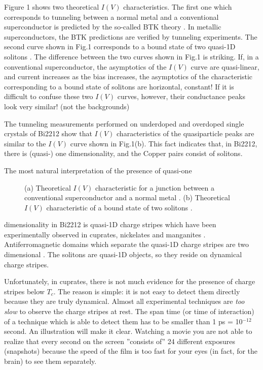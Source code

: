 Figure 1 shows two theoretical $I(V)$ characteristics. The first one which 
corresponds to tunneling between a normal metal and a conventional 
superconductor is predicted by the so-called BTK theory \cite{BTK}. In 
metallic superconductors, the BTK predictions are verified by tunneling 
experiments. The second curve shown in Fig.1 corresponds to a bound state 
of two quasi-1D solitons \cite{french}. The difference between the two 
curves shown in Fig.1 is striking. If, in a conventional 
superconductor, the asymptotics of the $I(V)$ curve are quasi-linear, and 
current increases as the bias increases, the asymptotics of the 
characteristic corresponding to a bound state of solitons are horizontal, 
constant! If it is difficult to confuse these two $I(V)$ curves, however, 
their conductance peaks look very similar! (not the backgrounds)

The tunneling measurements performed on underdoped and overdoped single
crystals of Bi2212 show that $I(V)$ characteristics of the
quasiparticle peaks are similar to the $I(V)$ curve shown in Fig.1(b). This 
fact indicates that, in Bi2212, there is (quasi-) one dimensionality, and the 
Copper pairs consist of solitons. 

The most natural interpretation of the presence of quasi-one
\begin{figure}[t]
\leftskip-10pt
\columnwidth
\centerline{}
\vspace{2mm}
\caption{(a) Theoretical $I(V)$ characteristic for a junction between 
a conventional superconductor and a normal metal \protect\cite{BTK}. 
(b) Theoretical $I(V)$ characteristic of a bound state of two solitons 
\protect\cite{french}. }
\label{fig1}
\end{figure} 
dimensionality in Bi2212 is quasi-1D charge stripes \cite{Gorkov,Zaanen} 
which have been experimentally observed in cuprates, nickelates and 
manganites \cite{Serve}. Antiferromagnetic domains which separate the 
quasi-1D charge stripes are two dimensional \cite{Tranquada}. The 
solitons are quasi-1D objects, so they reside on dynamical charge stripes. 

Unfortunately, in cuprates, there is not much evidence for the presence 
of charge stripes below $T_{c}$. The reason is simple: it is not easy 
to detect them directly because they are truly dynamical. Almost all 
experimental techniques are {\em too slow} to observe the charge stripes 
at rest. The span time (or time of interaction) of a technique which is able 
to detect them has to be smaller than 1 ps = 10$^{-12}$ second. An 
illustration will make it clear. Watching a movie you are not able to realize 
that every second on the screen ''consists of'' 24 different exposures 
(snapshots) because the speed of the film is too fast for your eyes (in fact, 
for the brain) to see them separately.

